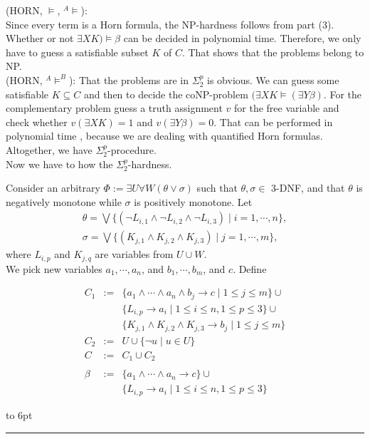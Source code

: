 \documentclass[12pt]{article}
\newcommand{\AMB}{\mbox{$^A$\hspace{-0.5mm}$\models^B$}}
\newcommand{\AM}{\mbox{$^A$\hspace{-0.5mm}$\models$}}
\newenvironment{proof}{\parindent=0pt{\bf Proof: }}{
   \hspace*{\fill}\hbox to 6pt{\leaders\hrule width 6pt height 6pt\hfill}\par}
\begin{document}
\begin{proof}
(HORN, $\models$, \AM):\\
Since every term is a Horn formula, the NP-hardness follows from part (3).
 Whether or not $\exists X K) \models \beta$ can be decided in polynomial time. Therefore, we only have to guess a satisfiable subset $K$ of $C$. That shows that the problems belong to NP.\\

(HORN, \AMB):  That the problems are in $\Sigma^p_2$ is obvious. We can guess some satisfiable $K \subseteq C$ and
then to decide the coNP-problem $(\exists X K \models (\exists Y \beta)$. For the complementary problem guess a
truth assignment $v$ for the free variable and check whether $v(\exists X K)=1$ and $v(\exists Y \beta)=0$.
That can be performed in polynomial time , because we are dealing with quantified Horn formulas. Altogether,
we have $\Sigma^p_2$-procedure.\\

Now we have to how the $\Sigma^p_2$-hardness.

\color{red}

Consider an arbitrary $\Phi:=\exists U\forall W (\theta\vee\sigma)$ such that $\theta, \sigma\in$ 3-DNF, and that $\theta$ is negatively monotone
while $\sigma$ is positively monotone.
%
Let $$\begin{array}{l}\theta=\bigvee\{(\neg L_{i,1}\wedge \neg L_{i,2}\wedge \neg L_{i,3})\mid i=1,\cdots,n\},\\ \sigma=\bigvee\{(K_{j,1}\wedge K_{j,2}\wedge K_{j,3})\mid j=1,\cdots,m\},\end{array}$$
where $L_{i,p}$ and $K_{j,q}$ are variables from $U\cup W$.\\

We pick new variables $a_1,\cdots, a_n$, and $b_1,\cdots, b_m$, and $c$. Define

$$\begin{array}{cll}C_1&:=&\{a_1\wedge\cdots\wedge a_n\wedge b_j\rightarrow c\mid 1\leq j\leq m\}\cup\\
&&\{L_{i,p}\rightarrow a_i\mid 1\leq i\leq n, 1\leq p\leq 3\}\cup\\
&&\{K_{j,1}\wedge K_{j,2}\wedge K_{j,3}\rightarrow b_j\mid 1\leq j\leq m\}\\
C_2&:=&U\cup\{\neg u\mid u\in U\}\\
C&:=&C_1\cup C_2\\ \\
\beta&:=&\{a_1\wedge\cdots\wedge a_n\rightarrow c\}\cup\\
&&\{L_{i,p}\rightarrow a_i \mid 1\leq i\leq n, 1\leq p\leq 3\}
\end{array}$$


\end{proof}
\end{document}
